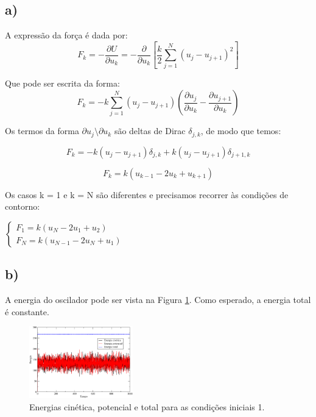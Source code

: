 \documentclass[a4wide]{report}
\begin{document}
\subsection*{a)}
A expressão da força é dada por:
\begin{equation}
F_k = -\frac{\partial U}{\partial u_k} = -\frac{\partial}{\partial u_k}\left[ \frac{k}{2}\sum_{j=1}^{N} (u_j - u_{j+1})^2 \right] 
\end{equation}

Que pode ser escrita da forma:
\begin{equation}
F_k = - k\sum_{j=1}^{N} (u_j - u_{j+1}) \left( \frac{\partial u_j}{\partial u_k} - \frac{\partial u_{j+1}}{\partial u_k}  \right)
\end{equation}

Os termos da forma $\partial u_j \setminus \partial u_k$ são deltas de Dirac $\delta_{j,k}$, de modo que temos:

\begin{equation*}
F_k = - k(u_j - u_{j+1}) \delta_{j,k} + k(u_j - u_{j+1}) \delta_{j+1,k} 
\end{equation*}

\begin{equation}
F_k = k(u_{k-1} - 2u_{k} + u_{k+1})  
\end{equation}

Os casos k = 1 e k = N são diferentes e precisamos recorrer às condições de contorno:

$\begin{cases} 
F_1 = k (u_{N} - 2u_1 + u_2) \\ 
F_N = k (u_{N-1} - 2u_N + u_1)
\end{cases} $

\subsection*{b)}

A energia do oscilador pode ser vista na Figura \ref{2b1}. Como esperado, a energia total é constante.
\begin{figure}[!htb]
\centering
\includegraphics[width=0.4\textwidth]{energia.pdf}
\caption{Energias cinética, potencial e total para as condições iniciais 1.}
\label{2b1}
\end{figure}
\end{document}
